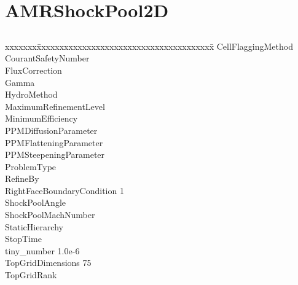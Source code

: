 \documentclass{book}
\begin{document}
\subsection{\cello}

\section{AMRShockPool2D} \label{s:AMRShockPool2D}

\subsection{\enzo}

{\parametersize
\begin{tabbing}
xxxxxxx\=xxxxxxxxxxxxxxxxxxxxxxxxxxxxxxxxxxxxxxx\=\kill
\> CellFlaggingMethod             \\
\> CourantSafetyNumber     \\
\> FluxCorrection          \\
\> Gamma                   \\
\> HydroMethod                 \\
\> MaximumRefinementLevel         \\
\> MinimumEfficiency            \\
\> PPMDiffusionParameter          \\
\> PPMFlatteningParameter         \\
\> PPMSteepeningParameter         \\
\> ProblemType                        \\
\> RefineBy                       \\
\> RightFaceBoundaryCondition  1   \\
\> ShockPoolAngle               \\
\> ShockPoolMachNumber       \\
\> StaticHierarchy                \\
\> StopTime                \\
\> tiny\_number               \> 1.0e-6   \\
\> TopGridDimensions           75 \\
\> TopGridRank                
\end{tabbing}}
\end{document}

